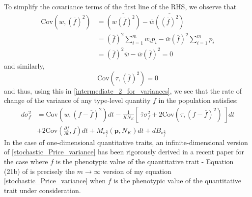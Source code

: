 To simplify the covariance terms of the first line of the RHS, we observe that
\begin{align*}
\textrm{Cov}\left(w, {\left(\overline{f}\right)}^2\right) &= \overline{\left(w{\left(\overline{f}\right)}^2\right)} - \overline{w}\overline{\left({\left(\overline{f}\right)}^2\right)}\\
&= {\left(\overline{f}\right)}^2\sum\limits_{i=1}^{m}w_ip_i - \overline{w}{\left(\overline{f}\right)}^2\sum\limits_{i=1}^{m}p_i\\
&= {\left(\overline{f}\right)}^2\overline{w} - \overline{w}{\left(\overline{f}\right)}^2 = 0
\end{align*}
and similarly,
\begin{equation*}
\textrm{Cov}\left(\tau, {\left(\overline{f}\right)}^2\right) = 0
\end{equation*}
and thus, using this in \eqref{intermediate_2_for_variances},  we see that the rate of change of the variance of any type-level quantity $f$ in the population satisfies:
\begin{equation}
\label{stochastic_Price_variance}
\begin{aligned}
d\sigma^2_{f} &= \textrm{Cov}\left(w,(f - \overline{f})^2\right)dt - \frac{1}{KN_K}\left[ \ \overline{\tau}\sigma^2_{f} +  2\textrm{Cov}\left(\tau,(f - \overline{f})^2\right) \ \right]dt\\[12pt]
& + 2\textrm{Cov}\left(\frac{\partial f}{\partial t},f\right)dt + M_{\sigma^2_f}(\mathbf{p},N_K)dt + dB_{\sigma^2_{f}}
\end{aligned}
\end{equation}
In the case of one-dimensional quantitative traits, an infinite-dimensional version of \eqref{stochastic_Price_variance} has been rigorously derived \citep{week_white_2021} in a recent paper for the case where $f$ is the phenotypic value of the quantitative trait - Equation (21b) of \cite{week_white_2021} is precisely the $m \to \infty$ version of my equation \eqref{stochastic_Price_variance} when $f$ is the phenotypic value of the quantitative trait under consideration.\\
